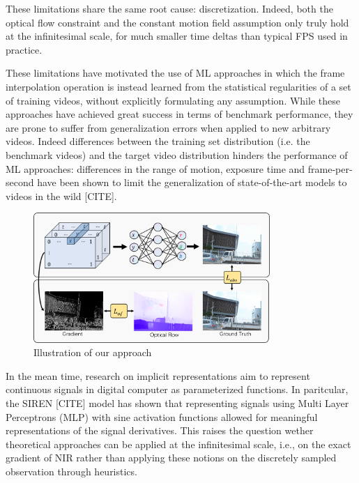 \documentclass{article}
\begin{document}
These limitations share the same root cause: discretization.
Indeed, both the optical flow constraint and the constant motion field assumption only truly hold at the infinitesimal scale, 
for much smaller time deltas than typical FPS used in practice.

These limitations have motivated the use of ML approaches in which the frame interpolation operation is instead learned 
from the statistical regularities of a set of training videos, without explicitly formulating any assumption. 
While these approaches have achieved great success in terms of benchmark performance,
they are prone to suffer from generalization errors when applied to new arbitrary videos. %
Indeed differences between the training set distribution (i.e. the benchmark videos) and the target video distribution hinders the performance of ML approaches:
differences in the range of motion, exposure time and frame-per-second have been shown to limit the
generalization of state-of-the-art models to videos in the wild [CITE]. %

\begin{figure}[h]
\centering
\includegraphics[width=0.8\textwidth]{Method}
\caption{Illustration of our approach}
\end{figure}


In the mean time, research on implicit representations aim to represent continuous signals in digital computer as parameterized functions. 
In paritcular, the SIREN [CITE] model has shown that representing signals using Multi Layer Perceptrons (MLP) with sine activation functions
allowed for meaningful representations of the signal derivatives.
This raises the question wether theoretical approaches can be applied at the infinitesimal scale, i.e., on the exact gradient
of NIR rather than applying these notions on the discretely sampled observation through heuristics.
\end{document}
